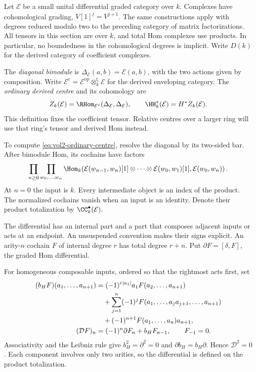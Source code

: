 Let $\mathcal E$ be a small unital differential graded category
over $k$. Complexes have cohomological grading,
$V[1]^j=V^{j+1}$. The same constructions apply with degrees reduced
modulo two to the preceding category of matrix factorizations.
All tensors in this section are over $k$, and total Hom complexes
use products. In particular, no boundedness in the cohomological
degrees is implicit.
Write $D(k)$ for the derived category of coefficient complexes.

The \emph{diagonal bimodule} is
$\Delta_{\mathcal E}(a,b)=\mathcal E(a,b)$, with the two actions
given by composition. Write
$\mathcal E^e=\mathcal E^{\mathrm{op}}\otimes_k^{\mathbb L}\mathcal E$
for the derived enveloping category. The
\emph{ordinary derived centre} and its cohomology are
\begin{equation}\label{eq:vol2-ordinary-centre}
 Z_k(\mathcal E)=
 \RHom_{\mathcal E^e}(\Delta_{\mathcal E},\Delta_{\mathcal E}),
 \qquad
 \HH_k^*(\mathcal E)=H^*Z_k(\mathcal E).
\end{equation}
This definition fixes the coefficient tensor. Relative centres over
a larger ring will use that ring's tensor and derived Hom instead.

To compute \eqref{eq:vol2-ordinary-centre}, resolve the diagonal
by its two-sided bar. After bimodule Hom, its cochains have factors
\begin{equation}\label{eq:vol2-all-object-bar}
 \prod_{n\ge0}\prod_{w_0,\ldots,w_n}
 \Hom_k\!\left(
 \mathcal E(w_{n-1},w_n)[1]\otimes\cdots\otimes
 \mathcal E(w_0,w_1)[1],\mathcal E(w_0,w_n)\right).
\end{equation}
At $n=0$ the input is $k$. Every intermediate object is an index
of the product. The normalized cochains vanish when an input is an
identity. Denote their product totalization by
$\CC_k^\bullet(\mathcal E)$.

The differential has an internal part and a part that composes
adjacent inputs or acts at an endpoint. An unsuspended convention
makes their signs explicit. An arity-$n$ cochain $F$ of internal
degree $r$ has total degree $r+n$. Put $\partial F=[\delta,F]$,
the graded Hom differential.

For homogeneous composable inputs,
ordered so that the rightmost acts first, set
\begin{align}\label{eq:vol2-hochschild-signs}
 (b_HF)(a_1,\ldots,a_{n+1})
 &=(-1)^{r|a_1|}a_1F(a_2,\ldots,a_{n+1})\notag\\
 &\quad+\sum_{j=1}^n(-1)^j
 F(a_1,\ldots,a_ja_{j+1},\ldots,a_{n+1})\notag\\
 &\quad+(-1)^{n+1}F(a_1,\ldots,a_n)a_{n+1},\\
 (\mathcal DF)_n&=(-1)^n\partial F_n+b_HF_{n-1},
 \qquad F_{-1}=0.\label{eq:vol2-hochschild-total}
\end{align}
Associativity and the Leibniz rule give
$b_H^2=\partial^2=0$ and $\partial b_H=b_H\partial$.
Hence $\mathcal D^2=0$. Each component involves only two arities,
so the differential is defined on the product totalization.

